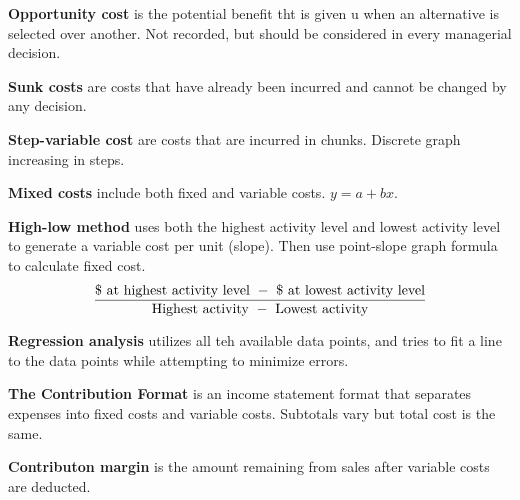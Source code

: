\documentclass[english, 12pt]{article}
\begin{document}
\begin{defn}
\textbf{Opportunity cost} is the potential benefit tht is given u when an alternative is selected over another. Not recorded, but should be considered in every managerial decision.
\end{defn}

\begin{defn}
\textbf{Sunk costs} are costs that have already been incurred and cannot be changed by any decision.
\end{defn}


\begin{defn}
\textbf{Step-variable cost} are costs that are incurred in chunks. Discrete graph increasing in steps.
\end{defn}
\begin{defn}
\textbf{Mixed costs} include both fixed and variable costs. $y = a + bx$.
\end{defn}

\begin{defn}
\textbf{High-low method} uses both the highest activity level and lowest activity level to generate a variable cost per unit (slope). Then use point-slope graph formula to calculate fixed cost.
\[\frac{\text{\$ at highest activity level } - \text{ \$ at lowest activity level}}{\text{Highest activity }-\text{ Lowest activity}}\]
\end{defn}

\begin{defn}
\textbf{Regression analysis} utilizes all teh available data points, and tries to fit a line to the data points while attempting to minimize errors. 
\end{defn}

\begin{defn}
\textbf{The Contribution Format} is an income statement format that separates expenses into fixed costs and variable costs. Subtotals vary but total cost is the same.
\end{defn}

\begin{defn}
\textbf{Contributon margin} is the amount remaining from sales after variable costs are deducted.
\end{defn}
\end{document}
